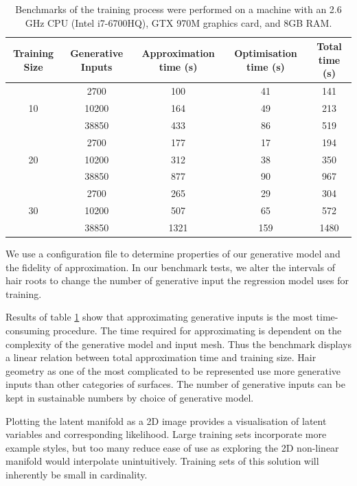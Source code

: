\documentclass[ %
author={Dillon Keith Diep},
supervisor={Dr. Carl Henrik Ek},
degree={MEng},
title={ART-CG Hair:},
subtitle={Assisted Real-time Content Generation of Stylised Virtual Hair},
type={Research},
year={2017} ]{dissertation}
\begin{document}
\begin{table}[!h]
	\centering
	\begin{tabular}{|c|c|c|c|c|}
		\hline
		Training Size & Generative Inputs &	Approximation time (s)	& Optimisation time (s)	&	Total time (s)\\
		\hline
		\multirow{3}{*}{10}
		& 2700 	& 100	    & 41     	& 141\\
		& 10200 & 164	    & 49		& 213\\
		& 38850 & 433      	& 86      	& 519\\
		\hline
		\multirow{3}{*}{20}
		& 2700 	& 177      	& 17        & 194\\
		& 10200 & 312      	& 38      	& 350\\
		& 38850 & 877		& 90	    & 967\\
		\hline
		\multirow{3}{*}{30}
		& 2700 	& 265      	& 29      	& 304\\
		& 10200 & 507      	& 65      	& 572\\
		& 38850 & 1321      & 159      	& 1480\\
		\hline
	\end{tabular}
	\caption{Benchmarks of the training process were performed on a machine with an 2.6 GHz CPU (Intel i7-6700HQ), GTX 970M graphics card, and 8GB RAM. }
	\label{trainingbenchmarks}
\end{table}

We use a configuration file to determine properties of our generative model and the fidelity of approximation. In our benchmark tests, we alter the intervals of hair roots to change the number of generative input the regression model uses for training.

Results of table \ref{trainingbenchmarks} show that approximating generative inputs is the most time-consuming procedure. The time required for approximating is dependent on the complexity of the generative model and input mesh. Thus the benchmark displays a linear relation between total approximation time and training size. Hair geometry as one of the most complicated to be represented use more generative inputs than other categories of surfaces. The number of generative inputs can be kept in sustainable numbers by choice of generative model.

Plotting the latent manifold as a 2D image provides a visualisation of latent variables and corresponding likelihood. Large training sets incorporate more example styles, but too many reduce ease of use as exploring the 2D non-linear manifold would interpolate unintuitively. Training sets of this solution will inherently be small in cardinality.
\end{document}
